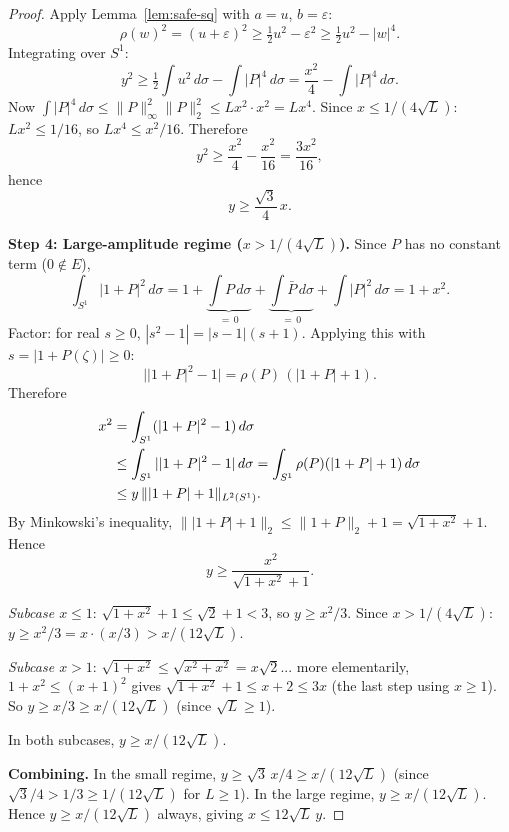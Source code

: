 \documentclass[11pt]{article}
\newcommand{\rhof}{\rho}
\newcommand{\norm}[1]{\lVert #1\rVert}
\begin{document}
\begin{proof}
Apply Lemma~\ref{lem:safe-sq} with $a = u$, $b = \varepsilon$:
\[
  \rhof(w)^2 = (u+\varepsilon)^2 \ge \tfrac{1}{2}u^2 - \varepsilon^2
  \ge \tfrac{1}{2}u^2 - |w|^4.
\]
Integrating over $S^1$:
\[
  y^2 \ge \tfrac{1}{2}\int u^2\,d\sigma - \int|P|^4\,d\sigma
  = \frac{x^2}{4} - \int|P|^4\,d\sigma.
\]
Now $\int|P|^4\,d\sigma \le \norm{P}_\infty^2\norm{P}_2^2 \le Lx^2\cdot x^2 = Lx^4$.
Since $x \le 1/(4\sqrt{L})$: $Lx^2 \le 1/16$, so $Lx^4 \le x^2/16$.
Therefore
\[
  y^2 \ge \frac{x^2}{4} - \frac{x^2}{16} = \frac{3x^2}{16},
\]
hence
\begin{equation}\label{eq:small-regime}
  y \ge \frac{\sqrt3}{4}\,x.
\end{equation}

\medskip\noindent\textbf{Step 4: Large-amplitude regime ($x > 1/(4\sqrt{L})$).}
Since $P$ has no constant term ($0 \notin E$),
\[
  \int_{S^1}|1+P|^2\,d\sigma
  = 1 + \underbrace{\int P\,d\sigma}_{=\,0} + \underbrace{\int\bar P\,d\sigma}_{=\,0}
    + \int|P|^2\,d\sigma
  = 1 + x^2.
\]
Factor: for real $s \ge 0$, $|s^2-1| = |s-1|(s+1)$.
Applying this with $s = |1+P(\zeta)| \ge 0$:
\[
  \bigl||1+P|^2-1\bigr| = \rhof(P)\,(|1+P|+1).
\]
Therefore
\begin{align}
  x^2
  &= \int_{S^1}(|1+P|^2-1)\,d\sigma \notag\\
  &\le \int_{S^1}||1+P|^2-1|\,d\sigma
   = \int_{S^1}\rhof(P)(|1+P|+1)\,d\sigma \notag\\
  &\le y\,\norm{|1+P|+1}_{L^2(S^1)}.
  \label{eq:CS-step}
\end{align}
By Minkowski's inequality,
$\norm{|1+P|+1}_2 \le \norm{1+P}_2 + 1 = \sqrt{1+x^2}+1$.
Hence
\begin{equation}\label{eq:quad-lower}
  y \ge \frac{x^2}{\sqrt{1+x^2}+1}.
\end{equation}

\textit{Subcase $x \le 1$}: $\sqrt{1+x^2}+1 \le \sqrt2+1 < 3$, so $y \ge x^2/3$.
Since $x > 1/(4\sqrt{L})$: $y \ge x^2/3 = x\cdot(x/3) > x/(12\sqrt{L})$.

\textit{Subcase $x > 1$}: $\sqrt{1+x^2} \le \sqrt{x^2+x^2} = x\sqrt{2}$...
more elementarily, $1+x^2 \le (x+1)^2$ gives $\sqrt{1+x^2}+1 \le x+2 \le 3x$
(the last step using $x \ge 1$).
So $y \ge x/3 \ge x/(12\sqrt{L})$ (since $\sqrt{L} \ge 1$).

In both subcases, $y \ge x/(12\sqrt{L})$.

\medskip\noindent\textbf{Combining.}
In the small regime, $y \ge \sqrt3\,x/4 \ge x/(12\sqrt{L})$
(since $\sqrt3/4 > 1/3 \ge 1/(12\sqrt{L})$ for $L \ge 1$).
In the large regime, $y \ge x/(12\sqrt{L})$.
Hence $y \ge x/(12\sqrt{L})$ always, giving $x \le 12\sqrt{L}\,y$.
\end{proof}
\end{document}

